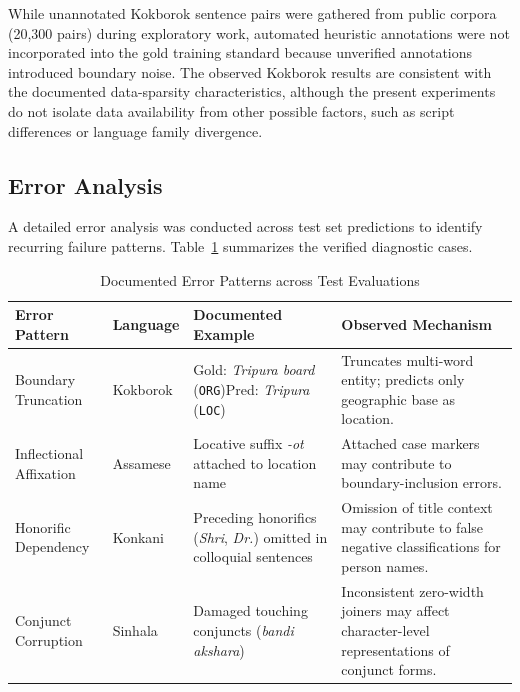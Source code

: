 \documentclass[pdflatex,sn-mathphys-num]{sn-jnl}
\begin{document}
While unannotated Kokborok sentence pairs were gathered from public corpora (20,300 pairs) during exploratory work, automated heuristic annotations were not incorporated into the gold training standard because unverified annotations introduced boundary noise. The observed Kokborok results are consistent with the documented data-sparsity characteristics, although the present experiments do not isolate data availability from other possible factors, such as script differences or language family divergence.

\subsection{Error Analysis}\label{subsec:error_analysis}

A detailed error analysis was conducted across test set predictions to identify recurring failure patterns. Table~\ref{tab:error_analysis} summarizes the verified diagnostic cases.

\begin{table}[htbp]
\centering
\caption{Documented Error Patterns across Test Evaluations}
\label{tab:error_analysis}
\footnotesize
\setlength{\tabcolsep}{4pt}
\begin{tabular}{llp{4.2cm}p{5.0cm}}
\toprule
\textbf{Error Pattern} & \textbf{Language} & \textbf{Documented Example} & \textbf{Observed Mechanism} \\
\midrule
Boundary Truncation & Kokborok & Gold: \textit{Tripura board} (\texttt{ORG})\newline Pred: \textit{Tripura} (\texttt{LOC}) & Truncates multi-word entity; predicts only geographic base as location. \\
\midrule
Inflectional Affixation & Assamese & Locative suffix \textit{-ot} attached to location name & Attached case markers may contribute to boundary-inclusion errors. \\
\midrule
Honorific Dependency    & Konkani  & Preceding honorifics (\textit{Shri}, \textit{Dr.}) omitted in colloquial sentences & Omission of title context may contribute to false negative classifications for person names. \\
\midrule
Conjunct Corruption     & Sinhala  & Damaged touching conjuncts (\textit{bandi akshara}) & Inconsistent zero-width joiners may affect character-level representations of conjunct forms. \\
\bottomrule
\end{tabular}
\end{table}
\end{document}

